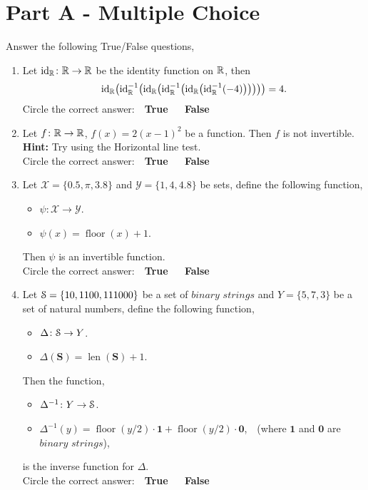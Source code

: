 \documentclass[12pt]{article} %
\begin{document}
\section*{Part A - Multiple Choice}
\begin{qstn} %
  Answer the following True/False questions,
  \begin{enumerate}
    \item Let $\operatorname{id}_\mathbb R \colon \mathbb R \to \mathbb R$ be the identity function on $\mathbb R$, then
       \[
              \operatorname{id}_\R\left(\operatorname{id}^{-1}_\R\left(\operatorname{id}_\R\left(\operatorname{id}^{-1}_\R\left(\operatorname{id}_\R\left(\operatorname{id}^{-1}_\R\left(-4
              \right) \right) \right) \right) \right) \right) = 4
      .\] 
      Circle the correct answer: \,\, \textbf{True} \,\,\,\,\,\, \textbf{False}

    \item Let $f \colon \mathbb R \to \mathbb R$, $f(x) = 2(x - 1)^2$ be a function. Then $f$ is not invertible. \\
      \textbf{Hint: }Try using the Horizontal line test.\\
      Circle the correct answer: \,\, \textbf{True} \,\,\,\,\,\, \textbf{False}

    \item Let $ \mathcal{X} = \{0.5, \pi, 3.8\} $ and $ \mathcal{Y} = \{1,4,4.8\} $ be sets, define the
            following function, 
            \begin{itemize}
              \item $\mathcal{\psi} \colon \mathcal{X} \to \mathcal{Y}$.
              \item $\mathcal{\psi}(x) = \operatorname{floor}(x) + 1$.
            \end{itemize}
            Then $\psi$ is an invertible function.\\
          Circle the correct answer: \,\, \textbf{True} \,\,\,\,\,\, \textbf{False}
   \item Let $ \EuScript{S} = \{10,1100, 111000\} $ be a set of $\textit{binary strings}$ and $ Y =
     \{5,7,3\} $ be a set of natural numbers, define the following function, 
              \begin{itemize}
                \item $\Delta \colon \EuScript{S} \to Y$.
                \item $\Delta(\textbf{S}) = \operatorname{len}(\textbf{S}) + 1$.
              \end{itemize}
              Then the function,
              \begin{itemize}
                \item $\Delta^{-1} \colon Y \to \EuScript{S}$.
                \item $\Delta^{-1}(y) = \operatorname{floor}(y / 2)\cdot \textbf{1} + \operatorname{floor}(y /
                  2)\cdot \textbf{0}$,
                  \,\,\,\,(where $\textbf{1}$ and $\textbf{0}$ are $\textit{binary strings}$),
              \end{itemize}
              is the inverse function for $\Delta$.\\
      Circle the correct answer: \,\, \textbf{True} \,\,\,\,\,\, \textbf{False}


\end{enumerate}
\end{qstn}
\end{document}
